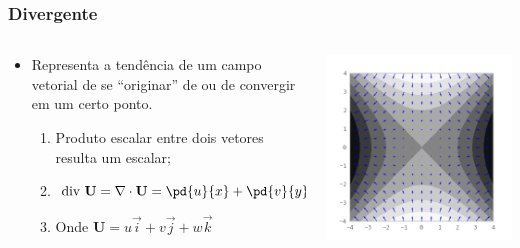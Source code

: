 \begin{frame}
\frametitle{Divergente}

  \begin{columns}
    \begin{column}{0.5\textwidth}
        \begin{itemize}[<+-| alert@+>]
          \item Representa a tendência de um campo vetorial de se ``originar''
                de ou de convergir em um certo ponto.
            \begin{enumerate}[<+-| alert@+>]
              \item Produto escalar entre dois vetores resulta um escalar;
              \item $\text{div }\mathbf{U} =
                    \nabla \cdot \mathbf{U} =
                    \pd{u}{x} + \pd{v}{y} + \pd{w}{z}$
              \item Onde $\mathbf{U} = u\vec{i}  +  v\vec{j} + w\vec{k}$
            \end{enumerate}
        \end{itemize}
    \end{column}
    \pause
    \begin{column}{0.5\textwidth}
      \begin{center}
        \includegraphics[scale=0.55]{./figures/divergence.png}
      \end{center}
    \end{column}
  \end{columns}

\end{frame}


